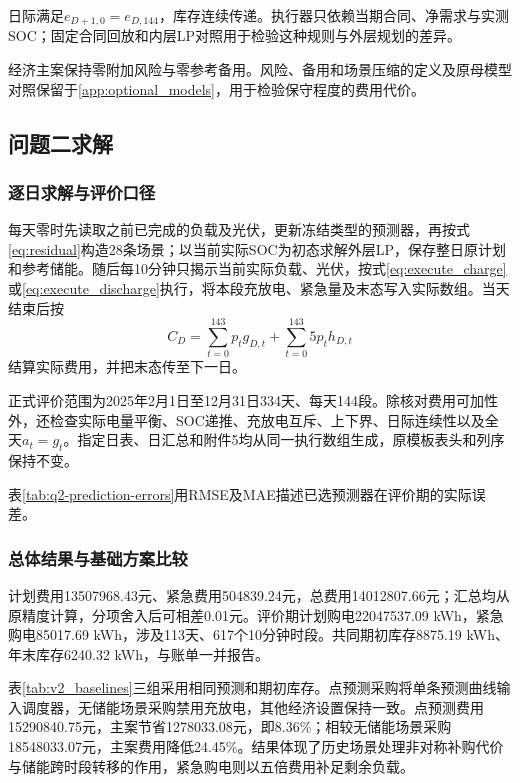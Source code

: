 日际满足$e_{D+1,0}=e_{D,144}$，库存连续传递。执行器只依赖当期合同、净需求与实测SOC；固定合同回放和内层LP对照用于检验这种规则与外层规划的差异。

经济主案保持零附加风险与零参考备用。风险、备用和场景压缩的定义及原母模型对照保留于\ref{app:optional_models}，用于检验保守程度的费用代价。

\subsection{问题二求解}

\subsubsection{逐日求解与评价口径}

每天零时先读取之前已完成的负载及光伏，更新冻结类型的预测器，再按式\eqref{eq:residual}构造28条场景；以当前实际SOC为初态求解外层LP，保存整日原计划和参考储能。随后每10分钟只揭示当前实际负载、光伏，按式\eqref{eq:execute_charge}或\eqref{eq:execute_discharge}执行，将本段充放电、紧急量及末态写入实际数组。当天结束后按
\begin{equation}
 C_D=\sum_{t=0}^{143}p_tg_{D,t}+\sum_{t=0}^{143}5p_th_{D,t}
 \label{eq:q2_actual_bill}
\end{equation}
结算实际费用，并把末态传至下一日。

正式评价范围为2025年2月1日至12月31日334天、每天144段。除核对费用可加性外，还检查实际电量平衡、SOC递推、充放电互斥、上下界、日际连续性以及全天$a_t=g_t$。指定日表、日汇总和附件5均从同一执行数组生成，原模板表头和列序保持不变。

表\ref{tab:q2-prediction-errors}用RMSE及MAE描述已选预测器在评价期的实际误差。


\subsubsection{总体结果与基础方案比较}

计划费用13507968.43元、紧急费用504839.24元，总费用14012807.66元；汇总均从原精度计算，分项舍入后可相差0.01元。评价期计划购电22047537.09 kWh，紧急购电85017.69 kWh，涉及113天、617个10分钟时段。共同期初库存8875.19 kWh、年末库存6240.32 kWh，与账单一并报告。



表\ref{tab:v2_baselines}三组采用相同预测和期初库存。点预测采购将单条预测曲线输入调度器，无储能场景采购禁用充放电，其他经济设置保持一致。点预测费用15290840.75元，主案节省1278033.08元，即8.36\%；相较无储能场景采购18548033.07元，主案费用降低24.45\%。结果体现了历史场景处理非对称补购代价与储能跨时段转移的作用，紧急购电则以五倍费用补足剩余负载。

